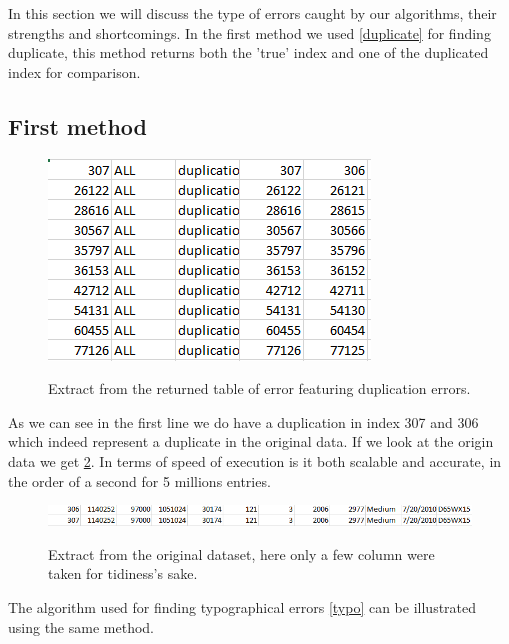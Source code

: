 \documentclass{article}
\begin{document}
In this section we will discuss the type of errors caught by our algorithms, their strengths and shortcomings.
In the first method we used \ref{duplicate} for finding duplicate, this method returns both the 'true' index and one of the duplicated index for comparison.
\subsection{First method}

\begin{figure}[h]
    \centering
    \includegraphics[scale=0.8]{picture/exp_duplicated.png}
    \label{fig:exp_duplicate}
    \caption{Extract from the returned table of error featuring duplication errors.}
\end{figure}

As we can see in the first line we do have a duplication in index 307 and 306 which indeed represent a duplicate in the original data. If we look at the origin data we get \ref{fig:exp_duplicate_db}. In terms of speed of execution is it both scalable and accurate, in the order of a second for 5 millions entries.

\begin{figure}[h]
    \centering
    \includegraphics[width=\linewidth]{picture/exp_duplicated_db.png}
    \label{fig:exp_duplicate_db}
    \caption{Extract from the original dataset, here only a few column were taken for tidiness's sake.}
\end{figure}

The algorithm used for finding typographical errors \ref{typo} can be illustrated using the same method.
\end{document}

